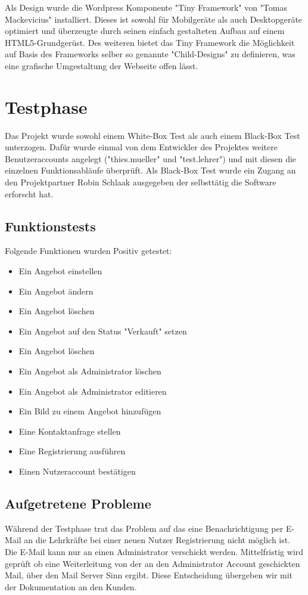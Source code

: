 \documentclass[a4paper, DIV20, 11pt, headsepline, parskip]{article}
\begin{document}
Als Design wurde die Wordpress Komponente "Tiny Framework" von "Tomas Mackevicius" installiert.
Dieses ist sowohl für Mobilgeräte als auch Desktopgeräte optimiert und überzeugte durch seinen einfach gestalteten Aufbau auf einem HTML5-Grundgerüst.
Des weiteren bietet das Tiny Framework die Möglichkeit auf Basis des Frameworks selber so genannte "Child-Designs" zu definieren, was eine grafische Umgestaltung der Webseite offen lässt.
\section{Testphase}
Das Projekt wurde sowohl einem White-Box Test als auch einem Black-Box Test unterzogen.
Dafür wurde einmal von dem Entwickler des Projektes weitere Benutzeraccounts angelegt ("thies.mueller" und "test.lehrer") und mit diesen die einzelnen Funktionsabläufe überprüft.
Als Black-Box Test wurde ein Zugang an den Projektpartner Robin Schlaak ausgegeben der selbsttätig die Software erforscht hat.
\subsection{Funktionstests}
Folgende Funktionen wurden Positiv getestet:
\begin{itemize}
\item Ein Angebot einstellen
\item Ein Angebot ändern
\item Ein Angebot löschen
\item Ein Angebot auf den Status "Verkauft" setzen
\item Ein Angebot löschen
\item Ein Angebot als Administrator löschen
\item Ein Angebot als Administrator editieren
\item Ein Bild zu einem Angebot hinzufügen
\item Eine Kontaktanfrage stellen
\item Eine Registrierung ausführen
\item Einen Nutzeraccount bestätigen
\end{itemize}
\subsection{Aufgetretene Probleme}
Während der Testphase trat das Problem auf das eine Benachrichtigung per E-Mail an die Lehrkräfte bei einer neuen Nutzer Registrierung nicht möglich ist.
Die E-Mail kann nur an einen Administrator verschickt werden.
Mittelfristig wird geprüft ob eine Weiterleitung von der an den Administrator Account geschickten Mail, über den Mail Server Sinn ergibt.
Diese Entscheidung übergeben wir mit der Dokumentation an den Kunden.
\end{document}
